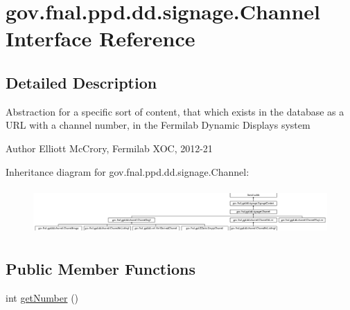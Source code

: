 \hypertarget{interfacegov_1_1fnal_1_1ppd_1_1dd_1_1signage_1_1Channel}{\section{gov.\-fnal.\-ppd.\-dd.\-signage.\-Channel Interface Reference}
\label{interfacegov_1_1fnal_1_1ppd_1_1dd_1_1signage_1_1Channel}
}


\subsection{Detailed Description}
Abstraction for a specific sort of content, that which exists in the database as a U\-R\-L with a channel number, in the Fermilab Dynamic Displays system

\begin{DoxyAuthor}{Author}
Elliott Mc\-Crory, Fermilab X\-O\-C, 2012-\/21 
\end{DoxyAuthor}
Inheritance diagram for gov.\-fnal.\-ppd.\-dd.\-signage.\-Channel\-:\begin{figure}[H]
\begin{center}
\leavevmode
\includegraphics[height=1.794872cm]{interfacegov_1_1fnal_1_1ppd_1_1dd_1_1signage_1_1Channel}
\end{center}
\end{figure}
\subsection*{Public Member Functions}
\begin{DoxyCompactItemize}
\item 
int \hyperlink{interfacegov_1_1fnal_1_1ppd_1_1dd_1_1signage_1_1Channel_ad6adca9a7ce66bbc80e2cb611c9c9587}{get\-Number} ()
\end{DoxyCompactItemize}


